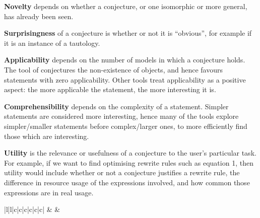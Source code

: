 {\bf Novelty} depends on whether a conjecture, or one isomorphic or more
general, has already been seen.

{\bf Surprisingness} of a conjecture is whether or not it is
``obvious'', for example if it is an instance of a tautology.

{\bf Applicability} depends on the number of models in which a
conjecture holds. The tool of \Bagai{} conjectures the non-existence of
objects, and hence favours statements with zero applicability. Other tools treat
applicability as a positive aspect: the more applicable the statement, the more
interesting it is.

{\bf Comprehensibility} depends on the complexity of a statement. Simpler
statements are considered more interesting, hence many of the tools explore
simpler/smaller statements before complex/larger ones, to more efficiently find
those which are interesting.

{\bf Utility} is the relevance or usefulness of a conjecture to the
user's particular task. For example, if we want to find optimising
rewrite rules such as equation 1, then utility would include whether
or not a conjecture justifies a rewrite rule, the difference in
resource usage of the expressions involved, and how common those
expressions are in real usage.


\begin{table}
  \centering
  \begin{tabular}{ |l|l|c|c|c|c|c|c| }
    \hline
                          &
                 &
     \\ \hhline{~~------}
    \tRow{          &                     & \iE & \iN & \iS & \iA & \iC & \iU}
  \end{tabular}
  \caption{Classification of MTE tools from~\cite{colton2000notion}, extended
    to include four more recent tools. The interestingness measures are
    \iE{}mpirical plausibility, \iN{}ovelty, \iS{}urprisingness,
    \iA{}pplicability, \iC{}omprehensibility (low complexity) and \iU{}tility.}
  \label{table:colton}
\end{table}

